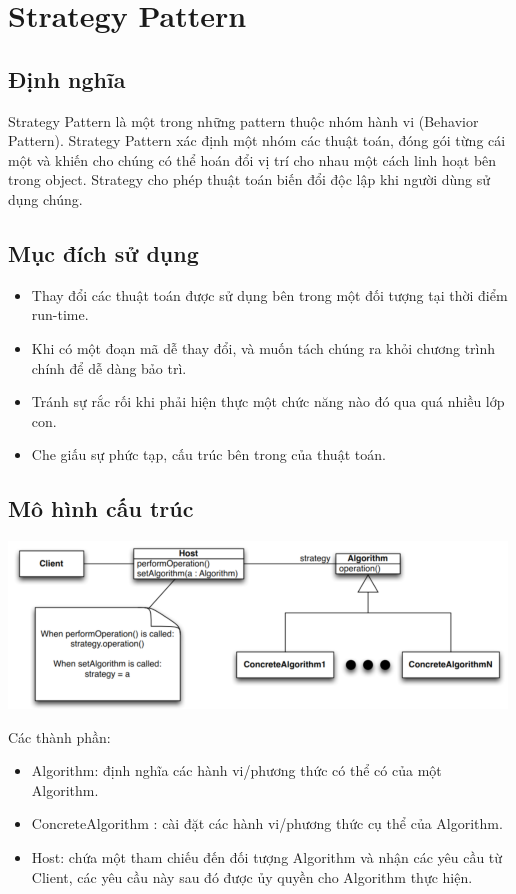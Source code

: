 \chapter{Strategy Pattern}

\section{Định nghĩa}
Strategy Pattern là một trong những pattern thuộc nhóm hành vi (Behavior Pattern). Strategy Pattern xác định một nhóm các thuật toán, đóng gói từng cái một và khiến cho chúng có thể hoán đổi vị trí cho nhau một cách linh hoạt bên trong object. Strategy cho phép thuật toán biến đổi độc lập khi người dùng sử dụng chúng.

\section{Mục đích sử dụng}
\begin{itemize}
\item Thay đổi các thuật toán được sử dụng bên trong một đối tượng tại thời điểm run-time.
\item Khi có một đoạn mã dễ thay đổi, và muốn tách chúng ra khỏi chương trình chính để dễ dàng bảo trì.
\item Tránh sự rắc rối khi phải hiện thực một chức năng nào đó qua quá nhiều lớp con.
\item Che giấu sự phức tạp, cấu trúc bên trong của thuật toán.
\end{itemize}

\section{Mô hình cấu trúc}
\begin{center}
\includegraphics{GALLEYS/images/chapter9/diagram}
\end{center}
Các thành phần:
\begin{itemize}
\item Algorithm: định nghĩa các hành vi/phương thức có thể có của một Algorithm.
\item ConcreteAlgorithm : cài đặt các hành vi/phương thức cụ thể của Algorithm.
\item Host: chứa một tham chiếu đến đối tượng Algorithm và nhận các yêu cầu từ Client, các yêu cầu này sau đó được ủy quyền cho Algorithm thực hiện.
\end{itemize}

